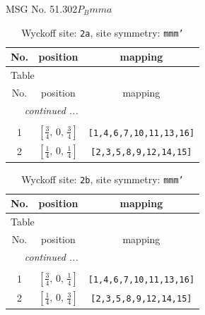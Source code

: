 \documentclass[fleqn,8pt]{jsarticle}
\begin{document}
\setcounter{MaxMatrixCols}{32}

\renewcommand{\tablename}{Table~}
\renewcommand{\figurename}{Figure~}
\begin{center}
\LARGE
MSG No. 51.302\quad$P_{B}mma$
\end{center}
\renewcommand{\arraystretch}{1.2}
\begin{longtable}{ccc}
\caption{Wyckoff site: {\tt 2a}, site symmetry: {\tt mmm'}}
 \\
 \hline \hline
No. & position & mapping \\ \hline \endfirsthead

\multicolumn{2}{l}{\tablename\ \thetable{}} \\
 \hline \hline
No. & position & mapping \\ \hline \endhead

 \hline \hline
\multicolumn{2}{r}{\footnotesize\it continued ...} \\ \endfoot

 \hline \hline
\multicolumn{2}{r}{} \\ \endlastfoot

1 & $\left[ \frac{3}{4},\, 0,\, \frac{3}{4} \right]$ & {\tt [1,4,6,7,10,11,13,16]} \\ \hline
2 & $\left[ \frac{1}{4},\, 0,\, \frac{1}{4} \right]$ & {\tt [2,3,5,8,9,12,14,15]} \\
\end{longtable}
\renewcommand{\arraystretch}{1.2}
\begin{longtable}{ccc}
\caption{Wyckoff site: {\tt 2b}, site symmetry: {\tt mmm'}}
 \\
 \hline \hline
No. & position & mapping \\ \hline \endfirsthead

\multicolumn{2}{l}{\tablename\ \thetable{}} \\
 \hline \hline
No. & position & mapping \\ \hline \endhead

 \hline \hline
\multicolumn{2}{r}{\footnotesize\it continued ...} \\ \endfoot

 \hline \hline
\multicolumn{2}{r}{} \\ \endlastfoot

1 & $\left[ \frac{3}{4},\, 0,\, \frac{1}{4} \right]$ & {\tt [1,4,6,7,10,11,13,16]} \\ \hline
2 & $\left[ \frac{1}{4},\, 0,\, \frac{3}{4} \right]$ & {\tt [2,3,5,8,9,12,14,15]} \\
\end{longtable}
\end{document}
